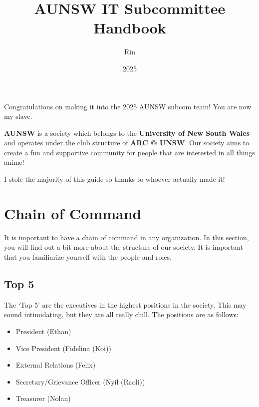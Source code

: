 \documentclass{article}
\title{AUNSW IT Subcommittee Handbook}
\date{2025}
\author{Rin}
\begin{document}
\renewcommand{\labelenumi}{(\roman{enumi})}
\renewcommand{\labelenumii}{(\alph{enumii})}
\maketitle
Congratulations on making it into the 2025 AUNSW subcom team! You are now my slave.

\textbf{AUNSW} is a society which belongs to the \textbf{University of New South Wales} and operates under the club structure of \textbf{ARC @ UNSW}. Our society aims to create a fun and supportive community for people that are interested in all things anime!

I stole the majority of this guide so thanks to whoever actually made it!

\section{Chain of Command}
It is important to have a chain of command in any organization. In this section, you will find out a bit more about the structure of our society. It is important that you familiarize yourself with the people and roles.
\subsection{Top 5}
The ‘Top 5’ are the executives in the highest positions in the society. This may sound intimidating, but they are all really chill. The positions are as follows:
\begin{itemize}
\item President (Ethan)
\item Vice President (Fidelina (Koi))
\item External Relations (Felix)
\item Secretary/Grievance Officer (Nyil (Raoli))
\item Treasurer (Nolan)
\end{itemize}
\end{document}
